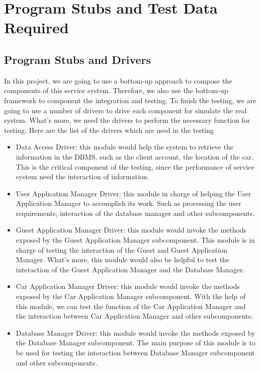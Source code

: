\documentclass{article}
\begin{document}
\newpage



\section{Program Stubs and Test Data Required}

\subsection{Program Stubs and Drivers}
In this project, we are going to use a bottom-up approach to compose the components of this service system. Therefore, we also use the bottom-up framework to component the integration and testing.
\newline
To finish the testing, we are going to use a number of drivers to drive each component for simulate the real system. What's more, we need the drivers to perform the necessary function for testing. 
\newline
Here are the list of the drivers which are used in the testing
\begin{itemize}
	\item Data Access Driver: this module would help the system to retrieve the information in the DBMS, such as the client account, the location of the car. This is the critical component of the testing, since the performance of service system need the interaction of information. 
	\item User Application Manager Driver: this module in charge of helping the User Application Manager to accomplish its work. Such as processing the user requirements, interaction of the database manager and other subcomponents.
	\item Guest Application Manager Driver: this module would invoke the methods exposed by the Guest Application Manager subcomponent. This module is in charge of testing the interaction of the Guest and Guest Application Manager. What's more, this module would also be helpful to test the interaction of the Guest Application Manager and the Database Manager.
	\item Car Application Manager Driver: this module would invoke the methods exposed by the Car Application Manager subcomponent. With the help of this module, we can test the function of the Car Application Manager and the interaction between Car Application Manager and other subcomponents. 
	\item Database Manager Driver: this module would invoke the methods exposed by the Database Manager subcomponent. The main purpose of this module is to be used for testing the interaction between Database Manager subcomponent and other subcomponents.
\end{itemize}
\end{document}

